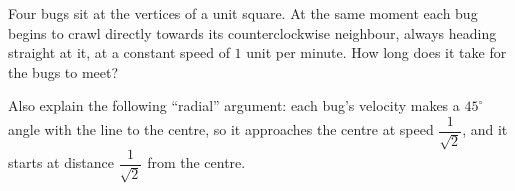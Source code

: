 Four bugs sit at the vertices of a unit square. At the same moment each bug begins to crawl directly towards its counterclockwise neighbour, always heading straight at it, at a constant speed of $1$ unit per minute. How long does it take for the bugs to meet?

Also explain the following ``radial'' argument: each bug's velocity makes a $45^\circ$ angle with the line to the centre, so it approaches the centre at speed $\dfrac{1}{\sqrt2}$, and it starts at distance $\dfrac{1}{\sqrt2}$ from the centre.
